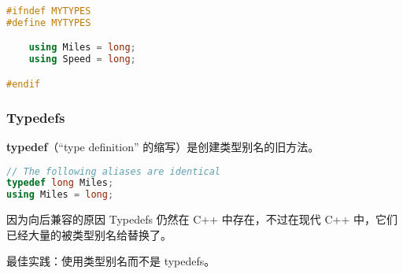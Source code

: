 \documentclass[../../LearnCpp.tex]{subfiles}
\begin{document}
\begin{lstlisting}[language=C++]
#ifndef MYTYPES
#define MYTYPES

    using Miles = long;
    using Speed = long;

#endif
\end{lstlisting}

\subsubsection*{Typedefs}

\textbf{typedef}（“type definition” 的缩写）是创建类型别名的旧方法。

\begin{lstlisting}[language=C++]
// The following aliases are identical
typedef long Miles;
using Miles = long;
\end{lstlisting}

因为向后兼容的原因 Typedefs 仍然在 C++ 中存在，不过在现代 C++ 中，它们已经大量的被类型别名给替换了。

最佳实践：使用类型别名而不是 typedefs。
\end{document}

